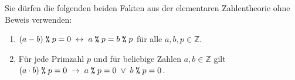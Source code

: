 \hint
Sie d\"{u}rfen die folgenden beiden Fakten aus der elementaren Zahlentheorie ohne Beweis verwenden:
\begin{enumerate}
\item $(a-b) \;\texttt{\symbol{37}}\;p = 0 \;\leftrightarrow\; a\;\texttt{\symbol{37}}\;p = b \;\texttt{\symbol{37}}\;p$
      \quad f\"{u}r alle $a,b,p \in \mathbb{Z}$.
\item F\"{u}r jede Primzahl $p$ und f\"{u}r beliebige Zahlen $a,b \in \mathbb{Z}$ gilt
      \\[0.2cm]
      \hspace*{1.3cm}
      $(a \cdot b) \;\texttt{\symbol{37}}\;p = 0 \;\rightarrow\; a \;\texttt{\symbol{37}}\;p = 0 \;\vee\; b \;\texttt{\symbol{37}}\;p = 0$.
      \eox
\end{enumerate}


